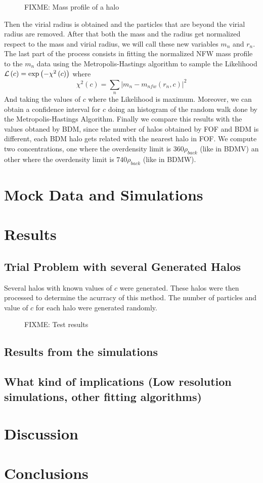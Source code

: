 \documentclass[useAMS,usenatbib]{mn2e}
\begin{document}
\begin{figure}[H]
\caption{FIXME: Mass profile of a halo}
\end{figure}

Then the virial radius is obtained and the particles that are beyond the virial radius are removed. After that both the mass and the radius get normalized respect to the mass and virial radius, we will call these new variables $m_{n}$ and $r_{n}$. The last part of the process consists in fitting the normalized NFW mass profile to the $m_{n}$ data using the Metropolis-Hastings algorithm to sample the Likelihood ${\cal L}\left(c\right)=\exp\left(-\chi^{2}\left(c\right)\right)$ where 
\[
\chi^{2}\left(c\right)=\sum\limits _{n}\left|m_{n}-m_{nfw}\left(r_{n},c\right)\right|^{2}
\]
And taking the values of $c$ where the Likelihood is maximum. Moreover, we can obtain a confidence interval for $c$ doing an histogram of the random walk done by the Metropolis-Hastings Algorithm. Finally we compare this results with the values obtaned by BDM, since the number of halos obtained by FOF and BDM is different, each BDM halo gets related with the nearest halo in FOF. We compute two concentrations, one where the overdensity limit is $360\rho_{back}$ (like in BDMV) an other where the overdensity limit is $740\rho_{back}$ (like in BDMW).

\section{Mock Data and Simulations}
\label{sec:data}
\section{Results}
\label{sec:results}

\subsection{Trial Problem with several Generated Halos}


Several halos with known values of $c$ were generated. These halos
were then processed to determine the acurracy of this method. The
number of particles and value of $c$ for each halo were generated
randomly.  
\begin{figure}[H]
\caption{FIXME: Test results}
\end{figure}



\subsection{Results from the simulations}


\subsection{What kind of implications (Low resolution simulations, other fitting algorithms)} 


\section{Discussion}
\label{sec:discussion}


\section{Conclusions}
\label{sec:conclusions}




\end{document}
